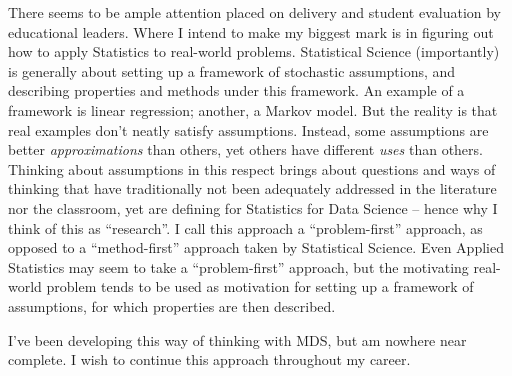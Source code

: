 \documentclass[]{book}
\begin{document}
There seems to be ample attention placed on delivery and student evaluation by educational leaders. Where I intend to make my biggest mark is in figuring out how to apply Statistics to real-world problems. Statistical Science (importantly) is generally about setting up a framework of stochastic assumptions, and describing properties and methods under this framework. An example of a framework is linear regression; another, a Markov model. But the reality is that real examples don't neatly satisfy assumptions. Instead, some assumptions are better \emph{approximations} than others, yet others have different \emph{uses} than others. Thinking about assumptions in this respect brings about questions and ways of thinking that have traditionally not been adequately addressed in the literature nor the classroom, yet are defining for Statistics for Data Science -- hence why I think of this as ``research''. I call this approach a ``problem-first'' approach, as opposed to a ``method-first'' approach taken by Statistical Science. Even Applied Statistics may seem to take a ``problem-first'' approach, but the motivating real-world problem tends to be used as motivation for setting up a framework of assumptions, for which properties are then described.

I've been developing this way of thinking with MDS, but am nowhere near complete. I wish to continue this approach throughout my career.
\end{document}

